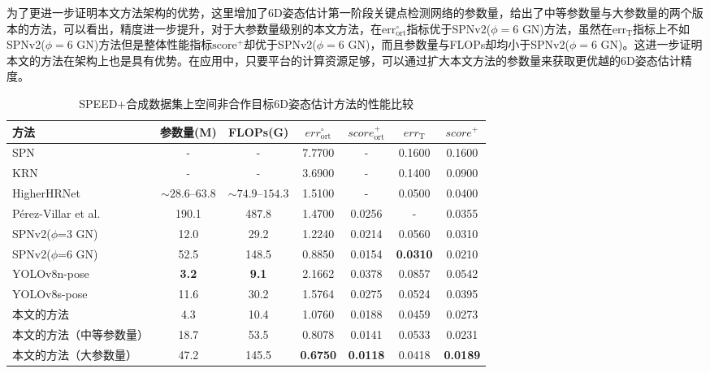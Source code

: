 为了更进一步证明本文方法架构的优势，这里增加了6D姿态估计第一阶段关键点检测网络的参数量，给出了中等参数量与大参数量的两个版本的方法，可以看出，精度进一步提升，对于大参数量级别的本文方法，在$\text{err}_{\text{ort}}^{\circ}$指标优于SPNv2($\phi=6$ GN)方法，虽然在$\text{err}_{\text{T}}$指标上不如SPNv2($\phi=6$ GN)方法但是整体性能指标$\text{score}^+$却优于SPNv2($\phi=6$ GN)，而且参数量与FLOPs却均小于SPNv2($\phi=6$ GN)。这进一步证明本文的方法在架构上也是具有优势。在应用中，只要平台的计算资源足够，可以通过扩大本文方法的参数量来获取更优越的6D姿态估计精度。
\begin{table}[htbp]
	\centering
	\caption{SPEED+合成数据集上空间非合作目标6D姿态估计方法的性能比较}
	\label{tab:SPEEDplus_Comparison}
	\setlength{\tabcolsep}{0.5mm}
	{
		\begin{tabular}{lcccccc}
			\toprule
			方法 & 参数量(M) & FLOPs(G) & $err_{\text{ort}}^{\circ}$ & $score_{\text{ort}}^+$ & $err_{\text{T}}$ & $score^+$ \\
			\midrule
			SPN\cite{sharma2019pose} & - & - & 7.7700 & - & 0.1600 & 0.1600 \\
			KRN\cite{park2019towards} & - & - & 3.6900 & - & 0.1400 & 0.0900 \\
			HigherHRNet \cite{higherhrnet} & $\sim 28.6\text{–}63.8$ & $\sim 74.9\text{–}154.3$ & 1.5100 & - & 0.0500 & 0.0400 \\
			P\'erez-Villar et al. \citep{perez2022spacecraft} & 190.1 & 487.8 & 1.4700 & 0.0256 & - & 0.0355 \\
			SPNv2($\phi$=3 GN) \cite{park2024robust} & 12.0 & 29.2 & 1.2240 & 0.0214 & 0.0560 & 0.0310 \\
			SPNv2($\phi$=6 GN) \cite{park2024robust} & 52.5 & 148.5 & 0.8850 & 0.0154 & \textbf{0.0310} & 0.0210 \\
			YOLOv8n-pose\cite{yolov8_ultralytics} & \textbf{3.2} & \textbf{9.1} & 2.1662 & 0.0378 & 0.0857 & 0.0542 \\
			YOLOv8s-pose\cite{yolov8_ultralytics} & 11.6 & 30.2 & 1.5764 & 0.0275 & 0.0524 & 0.0395 \\
			本文的方法 & 4.3 & 10.4 & 1.0760 & 0.0188 & 0.0459 & 0.0273 \\
			本文的方法（中等参数量） & 18.7 & 53.5 & 0.8078 & 0.0141 & 0.0533 & 0.0231 \\
			本文的方法（大参数量） & 47.2 & 145.5 & \textbf{0.6750} & \textbf{0.0118} & 0.0418 & \textbf{0.0189} \\
			\bottomrule
		\end{tabular}
	}
\end{table}




